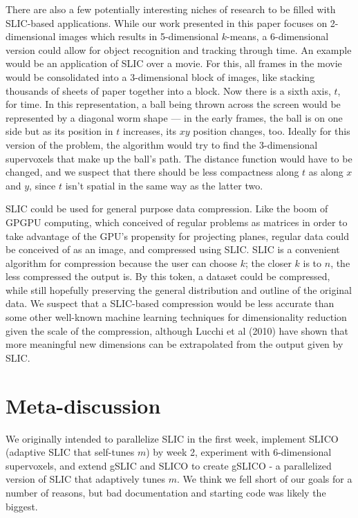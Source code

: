 \documentclass[11pt,twocolumn]{article}
\begin{document}
There are also a few potentially interesting niches of research to be filled with SLIC-based applications. While our work presented in this paper focuses on 2-dimensional images which results in 5-dimensional $k$-means, a 6-dimensional version could allow for object recognition and tracking through time. An example would be an application of SLIC over a movie. For this, all frames in the movie would be consolidated into a 3-dimensional block of images, like stacking thousands of sheets of paper together into a block. Now there is a sixth axis, $t$, for time. In this representation, a ball being thrown across the screen would be represented by a diagonal worm shape --- in the early frames, the ball is on one side but as its position in $t$ increases, its $xy$ position changes, too. Ideally for this version of the problem, the algorithm would try to find the 3-dimensional supervoxels that make up the ball's path. The distance function would have to be changed, and we suspect that there should be less compactness along $t$ as along $x$ and $y$, since $t$ isn't spatial in the same way as the latter two.

SLIC could be used for general purpose data compression. Like the boom of GPGPU computing, which conceived of regular problems as matrices in order to take advantage of the GPU's propensity for projecting planes, regular data could be conceived of as an image, and compressed using SLIC. SLIC is a convenient algorithm for compression because the user can choose $k$; the closer $k$ is to $n$, the less compressed the output is. By this token, a dataset could be compressed, while still hopefully preserving the general distribution and outline of the original data. We suspect that a SLIC-based compression would be less accurate than some other well-known machine learning techniques for dimensionality reduction given the scale of the compression, although Lucchi et al (2010) have shown that more meaningful new dimensions can be extrapolated from the output given by SLIC.\cite{medical}

\section{Meta-discussion}\label{meta}

We originally intended to parallelize SLIC in the first week, implement SLICO (adaptive SLIC that self-tunes $m$) by week 2, experiment with 6-dimensional supervoxels, and extend gSLIC and SLICO to create gSLICO - a parallelized version of SLIC that adaptively tunes $m$. We think we fell short of our goals for a number of reasons, but bad documentation and starting code was likely the biggest. 
\end{document}
